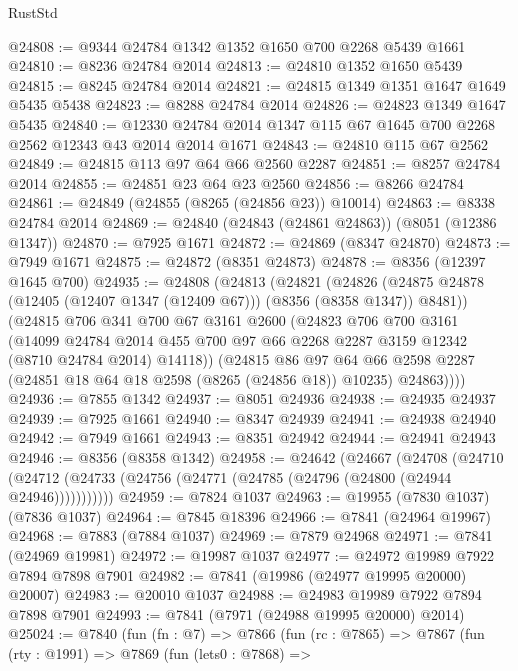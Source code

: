 \begin{lexlean}{RustStd}
\begin{coremodule}
{\begin{coremodule}
{{{{{{{{{{{{{{{{{{{{{{{{{{{{{{{{{{{{{{{{{{{{{{{{{{{{{{@24808 := @9344 @24784 @1342 @1352 @1650 @700 @2268 @5439 @1661
@24810 := @8236 @24784 @2014
@24813 := @24810 @1352 @1650 @5439
@24815 := @8245 @24784 @2014
@24821 := @24815 @1349 @1351 @1647 @1649 @5435 @5438
@24823 := @8288 @24784 @2014
@24826 := @24823 @1349 @1647 @5435
@24840 := @12330 @24784 @2014 @1347 @115 @67 @1645 @700 @2268 @2562 @12343 @43 @2014 @2014 @1671
@24843 := @24810 @115 @67 @2562
@24849 := @24815 @113 @97 @64 @66 @2560 @2287
@24851 := @8257 @24784 @2014
@24855 := @24851 @23 @64 @23 @2560
@24856 := @8266 @24784
@24861 := @24849 (@24855 (@8265 (@24856 @23)) @10014)
@24863 := @8338 @24784 @2014
@24869 := @24840 (@24843 (@24861 @24863)) (@8051 (@12386 @1347))
@24870 := @7925 @1671
@24872 := @24869 (@8347 @24870)
@24873 := @7949 @1671
@24875 := @24872 (@8351 @24873)
@24878 := @8356 (@12397 @1645 @700)
@24935 := @24808
    (@24813
      (@24821
        (@24826 (@24875 @24878 (@12405 (@12407 @1347 (@12409 @67))) (@8356 (@8358 @1347)) @8481))
        (@24815
          @706
          @341
          @700
          @67
          @3161
          @2600
          (@24823
            @706
            @700
            @3161
            (@14099
              @24784
              @2014
              @455
              @700
              @97
              @66
              @2268
              @2287
              @3159
              @12342
              (@8710 @24784 @2014)
              @14118))
          (@24815
            @86
            @97
            @64
            @66
            @2598
            @2287
            (@24851 @18 @64 @18 @2598 (@8265 (@24856 @18)) @10235)
            @24863))))
@24936 := @7855 @1342
@24937 := @8051 @24936
@24938 := @24935 @24937
@24939 := @7925 @1661
@24940 := @8347 @24939
@24941 := @24938 @24940
@24942 := @7949 @1661
@24943 := @8351 @24942
@24944 := @24941 @24943
@24946 := @8356 (@8358 @1342)
@24958 := @24642
    (@24667
      (@24708
        (@24710 (@24712 (@24733 (@24756 (@24771 (@24785 (@24796 (@24800 (@24944 @24946)))))))))))
@24959 := @7824 @1037
@24963 := @19955 (@7830 @1037) (@7836 @1037)
@24964 := @7845 @18396
@24966 := @7841 (@24964 @19967)
@24968 := @7883 (@7884 @1037)
@24969 := @7879 @24968
@24971 := @7841 (@24969 @19981)
@24972 := @19987 @1037
@24977 := @24972 @19989 @7922 @7894 @7898 @7901
@24982 := @7841 (@19986 (@24977 @19995 @20000) @20007)
@24983 := @20010 @1037
@24988 := @24983 @19989 @7922 @7894 @7898 @7901
@24993 := @7841 (@7971 (@24988 @19995 @20000) @2014)
@25024 := @7840
    (fun (fn : @7) =>
    @7866
      (fun (rc : @7865) =>
      @7867
        (fun (rty : @1991) =>
        @7869
          (fun (lets0 : @7868) =>
}}}}}}}}}}}}}}}}}}}}}}}}}}}}}}}}}}}}}}}}}}}}}}}}}}}}}}
\end{coremodule}}
\end{coremodule}
\end{lexlean}
